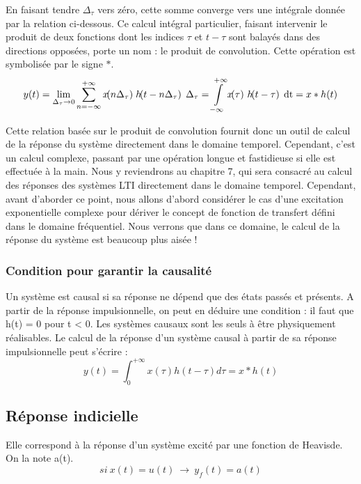 \begin{remark}{}
	En faisant tendre $ \Delta_\tau $ vers zéro, cette somme
        converge vers une intégrale donnée par la relation
        ci-dessous. Ce calcul intégral particulier, faisant intervenir
        le produit de deux fonctions dont les indices $\tau $ et
        $t-\tau $ sont balayés dans des directions opposées, porte un
        nom : le produit de convolution. Cette opération est
        symbolisée par le signe $*$.
	\begin{equation}\label{Demo_produit_convolution}
          y(t) = \lim_{\Delta_\tau \to 0} \somme{n=-\infty}{+\infty}{x\de{n\Delta_\tau}}  \;  h\de{t-n\Delta_\tau}\;\Delta_\tau = \intDt{-\infty}{+\infty}{x\de{\tau}\, h\de{t-\tau}} = x*h(t)
	\end{equation}
	
	Cette relation basée sur le produit de convolution fournit
        donc un outil de calcul de la réponse du système directement
        dans le domaine temporel. Cependant, c'est un calcul complexe,
        passant par une opération longue et fastidieuse si elle est
        effectuée à la main. Nous y reviendrons au chapitre 7, qui
        sera consacré au calcul des réponses des systèmes LTI
        directement dans le domaine temporel. Cependant, avant
        d'aborder ce point, nous allons d'abord considérer le cas
        d'une excitation exponentielle complexe pour dériver le
        concept de fonction de transfert défini dans le domaine
        fréquentiel. Nous verrons que dans ce domaine, le calcul de la
        réponse du système est beaucoup plus aisée !
	
	\subsubsection{Condition pour garantir la causalité}
	Un système est causal si sa réponse ne dépend que des états
        passés et présents. A partir de la réponse impulsionnelle, on
        peut en déduire une condition : il faut que h(t) = 0 pour t <
        0. Les systèmes causaux sont les seuls à être physiquement
        réalisables. Le calcul de la réponse d'un système causal à
        partir de sa réponse impulsionnelle peut s'écrire :
	\begin{equation}\label{}
          y(t) = \int_{0}^{+ \infty} x(\tau)  h(t-\tau)d\tau = x*h(t)
	\end{equation}
	\vspace{1\baselineskip}
	
	\subsection{Réponse indicielle}
	Elle correspond à la réponse d'un système excité par une
        fonction de Heavisde. On la note a(t).
	\begin{equation}\label{key}
          si~x(t)=u(t)~\rightarrow ~y_{f}(t)=a(t)
	\end{equation}


\end{remark}
